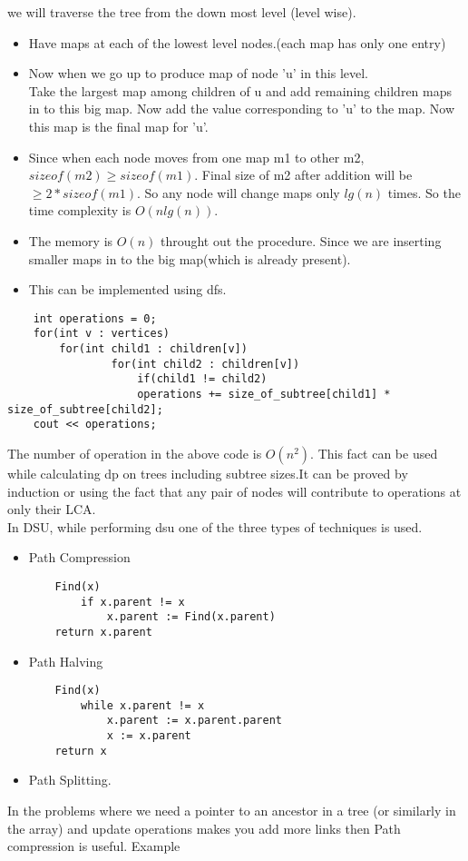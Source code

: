 \documentclass[../Notes.tex]{subfiles}
\begin{document}
we will traverse the tree from the down most level (level wise).

\begin{itemize}
	\item Have maps at each of the lowest level nodes.(each map has only one entry)
	\item Now when we go up to produce map of node 'u' in this level.\\
	Take the largest map among children of u and add remaining children maps in to this big map. Now add the value corresponding to 'u' to the map. Now this map is the final map for 'u'.
	\item Since when each node moves from one map m1 to other m2, $sizeof(m2) \geq sizeof(m1)$. Final size of m2 after addition will be $\geq 2*sizeof(m1)$. So any node will change maps only $lg(n)$ times. So the time complexity is $O(nlg(n))$.
	\item The memory is $O(n)$ throught out the procedure. Since we are inserting smaller maps in to the big map(which is already present).
	\item This can be implemented using dfs.
\end{itemize}

\begin{lstlisting}
	int operations = 0;
	for(int v : vertices)
  		for(int child1 : children[v])
    			for(int child2 : children[v])
    				if(child1 != child2)
      				operations += size_of_subtree[child1] * size_of_subtree[child2];
	cout << operations;
\end{lstlisting}
The number of operation in the above code is $O(n^2)$. This fact can be used while calculating dp on trees including subtree sizes.It can be proved by induction or using the fact that any pair of nodes will contribute to operations at only their LCA.\\


In DSU, while performing dsu one of the three types of techniques is used.
\begin{itemize}
	\item Path Compression \\
	\begin{lstlisting}
	Find(x)
    	if x.parent != x
     		x.parent := Find(x.parent)
	return x.parent
   	\end{lstlisting}
   	
   	\item Path Halving \\
   	\begin{lstlisting}
   	Find(x)
   		while x.parent != x
     		x.parent := x.parent.parent
     		x := x.parent
   	return x
   \end{lstlisting}
   
   \item Path Splitting.
\end{itemize}
In the problems where we need a pointer to an ancestor in a tree (or similarly in the array) and update operations makes you add more links then Path compression is useful. Example \\
\end{document}
